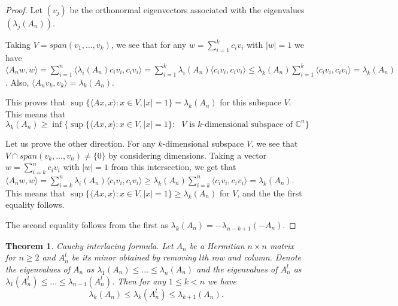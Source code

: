 \documentclass[12pt,a4paper,leqno]{report}
\newcommand{\C}{\mathbb{C}}
\theoremstyle{plain}
\newtheorem{theo}[equation]{Theorem}
\theoremstyle{definition}
\theoremstyle{remark}
\begin{document}
\begin{proof}
Let $(v_j)$ be the orthonormal eigenvectors associated with the eigenvalues $(\lambda_j(A_n))$.

Taking $V=span(v_1,\ldots,v_k)$, we see that for any $w=\sum_{i=1}^k c_iv_i$ with $|w|=1$ we have $\langle A_nw,w \rangle = \sum_{i=1}^n \langle \lambda_i(A_n)c_iv_i,c_iv_i \rangle = \sum_{i=1}^k \lambda_i(A_n) \langle c_iv_i,c_iv_i \rangle \leq \lambda_k(A_n) \sum_{i=1}^k \langle c_iv_i,c_iv_i \rangle = \lambda_k(A_n)$. Also, $\langle A_nv_k,v_k \rangle = \lambda_k(A_n)$.

This proves that $\sup \{\langle Ax,x \rangle : x \in V, |x|=1\} = \lambda_k(A_n)$ for this subspace $V$. This means that
\begin{equation*}
\lambda_k(A_n) \geq \inf \{ \sup\{\langle Ax,x \rangle : x \in V, |x|=1\} : \textrm{ $V$ is $k$-dimensional subspace of $\C^n$} \}
\end{equation*}

Let us prove the other direction. For any $k$-dimensional subspace $V$, we see that $V \cap span(v_k,\ldots,v_n) \neq \{0\}$ by considering dimensions. Taking a vector $w=\sum_{i=k}^n c_iv_i$ with $|w|=1$ from this intersection, we get that
$\langle A_nw,w \rangle = \sum_{i=k}^n \lambda_i(A_n) \langle c_iv_i,c_iv_i \rangle \geq \lambda_k(A_n) \sum_{i=k}^n \langle c_iv_i,c_iv_i \rangle = \lambda_k(A_n)$. This means that $\sup\{\langle Ax,x \rangle : x \in V, |x|=1\} \geq \lambda_k(A_n)$ for $V$, and the the first equality follows.

The second equality follows from the first as $\lambda_k(A_n) = -\lambda_{n-k+1}(-A_n)$.
\end{proof}

\begin{theo}
Cauchy interlacing formula. Let $A_n$ be a Hermitian $n \times n$ matrix for $n\geq 2$ and $A_n^l$ be its minor obtained by removing $l$th row and column. Denote the eigenvalues of $A_n$ as $\lambda_1(A_n) \leq \ldots \leq \lambda_n(A_n)$ and the eigenvalues of $A_n^l$ as $\lambda_1(A_n^l) \leq \ldots \leq \lambda_{n-1}(A_n^l)$. Then for any $1 \leq k < n$ we have
\begin{equation*}
\lambda_k(A_n) \leq \lambda_k(A_n^l) \leq \lambda_{k+1}(A_n).
\end{equation*}
\end{theo}
\end{document}
